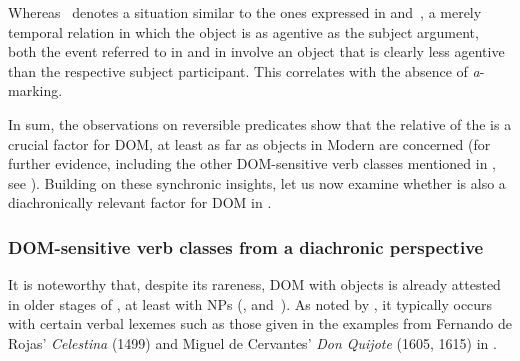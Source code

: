 \documentclass[output=paper]{LSP/langsci}
\begin{document}
Whereas~ denotes a situation similar to the ones expressed in  and~, \ie a merely temporal relation in which the object is as agentive as the subject argument, both the event referred to in  and in  involve an object that is clearly less agentive than the respective subject participant. This correlates with the absence of \textit{a}-marking. 

In sum, the observations on reversible predicates show that the relative  of the  is a crucial factor for DOM, at least as far as  objects in Modern  are concerned (for further evidence, including the other DOM-sensitive verb classes mentioned in , see \citealt[Ch. 6]{GarciaGarcia2014Objektmarkierung}). Building on these synchronic insights, let us now examine whether  is also a diachronically relevant factor for DOM in .

\subsubsection{DOM-sensitive verb classes from a diachronic perspective}\label{08-ga-sec:4.3.2}

It is noteworthy that, despite its rareness, DOM with  objects is already attested in older stages of , at least with  NPs (\cf {},  and~). As noted by \citet[451]{Laca2006Objeto}, it typically occurs with certain verbal lexemes such as those given in the examples from Fernando de Rojas’ \textit{Celestina} (1499) and Miguel de Cervantes’ \textit{Don Quijote} (1605, 1615) in . 
\end{document}
